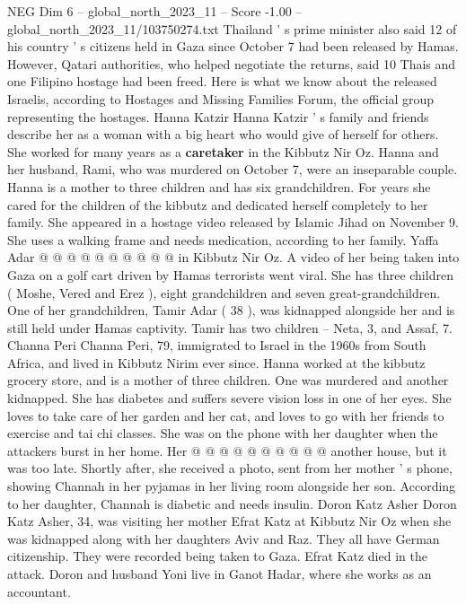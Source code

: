 \begin{textsample}{NEG Dim 6 – global\_north\_2023\_11 – Score -1.00 – global\_north\_2023\_11/103750274.txt}  \label{ex:f6_neg_234}
Thailand ' s prime minister also said 12 of his country ' s citizens held in Gaza since October 7 had been released by Hamas.
However, Qatari authorities, who helped negotiate the returns, said 10 Thais and one Filipino hostage had been freed.
Here is what we know about the released Israelis, according to Hostages and Missing Families Forum, the official group representing the hostages.
Hanna Katzir Hanna Katzir ' s family and friends describe her as a woman with a big heart who would give of herself for others.
She worked for many years as a \textbf{caretaker} in the Kibbutz Nir Oz.
Hanna and her husband, Rami, who was murdered on October 7, were an inseparable couple.
Hanna is a mother to three children and has six grandchildren.
For years she cared for the children of the kibbutz and dedicated herself completely to her family.
She appeared in a hostage video released by Islamic Jihad on November 9.
She uses a walking frame and needs medication, according to her family.
Yaffa Adar @ @ @ @ @ @ @ @ @ @ in Kibbutz Nir Oz.
A video of her being taken into Gaza on a golf cart driven by Hamas terrorists went viral.
She has three children ( Moshe, Vered and Erez ), eight grandchildren and seven great-grandchildren.
One of her grandchildren, Tamir Adar ( 38 ), was kidnapped alongside her and is still held under Hamas captivity.
Tamir has two children -- Neta, 3, and Assaf, 7.
Channa Peri Channa Peri, 79, immigrated to Israel in the 1960s from South Africa, and lived in Kibbutz Nirim ever since.
Hanna worked at the kibbutz grocery store, and is a mother of three children.
One was murdered and another kidnapped.
She has diabetes and suffers severe vision loss in one of her eyes.
She loves to take care of her garden and her cat, and loves to go with her friends to exercise and tai chi classes.
She was on the phone with her daughter when the attackers burst in her home.
Her @ @ @ @ @ @ @ @ @ @ another house, but it was too late.
Shortly after, she received a photo, sent from her mother ' s phone, showing Channah in her pyjamas in her living room alongside her son.
According to her daughter, Channah is diabetic and needs insulin.
Doron Katz Asher Doron Katz Asher, 34, was visiting her mother Efrat Katz at Kibbutz Nir Oz when she was kidnapped along with her daughters Aviv and Raz.
They all have German citizenship.
They were recorded being taken to Gaza.
Efrat Katz died in the attack.
Doron and husband Yoni live in Ganot Hadar, where she works as an accountant.

\end{textsample}
